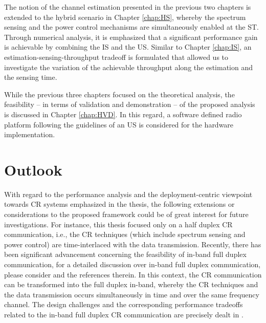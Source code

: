 The notion of the channel estimation presented in the previous two chapters is extended to the hybrid scenario in Chapter \ref{chap:HS}, whereby the spectrum sensing and the power control mechanisms are simultaneously enabled at the ST. Through numerical analysis, it is emphasized that a significant performance gain is achievable by combining the IS and the US. Similar to Chapter \ref{chap:IS}, an estimation-sensing-throughput tradeoff is formulated that allowed us to investigate the variation of the achievable throughput along the estimation and the sensing time. 

While the previous three chapters focused on the theoretical analysis, the feasibility -- in terms of validation and demonstration -- of the proposed analysis is discussed in Chapter \ref{chap:HVD}. In this regard, a software defined radio platform following the guidelines of an US is considered for the hardware implementation. 


\section{Outlook}
With regard to the performance analysis and the deployment-centric viewpoint towards CR systems emphasized in the thesis, the following extensions or considerations to the proposed framework could be of great interest for future investigations. For instance, this thesis focused only on a half duplex CR communication, i.e., the CR techniques (which include spectrum sensing and power control) are time-interlaced with the data transmission. Recently, there has been significant advancement concerning the feasibility of in-band full duplex communication, for a detailed discussion over in-band full duplex communication, please consider \cite{Bhar13, Sab14, Liu15} and the references therein. In this context, the CR communication can be transformed into the full duplex in-band, whereby the CR techniques and the data transmission occurs simultaneously in time and over the same frequency channel. The design challenges and the corresponding performance tradeoffs related to the in-band full duplex CR communication are precisely dealt in \cite{Liao15, Kim15}. 

